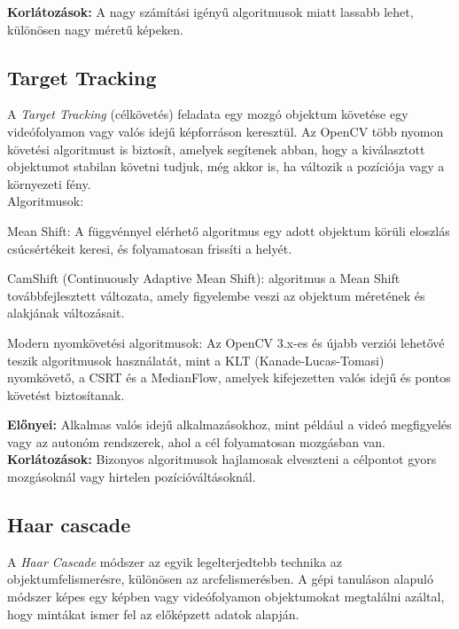 \textbf{Korlátozások:} A nagy számítási igényű algoritmusok miatt lassabb lehet, különösen nagy méretű képeken.

\subsection{Target Tracking } \label{sec:soft_target}

A \textsl{Target Tracking} \cite{targettracking} (célkövetés) feladata egy mozgó objektum követése egy videófolyamon vagy valós idejű képforráson keresztül. Az OpenCV több nyomon követési algoritmust is biztosít, amelyek segítenek abban, hogy a kiválasztott objektumot stabilan követni tudjuk, még akkor is, ha változik a pozíciója vagy a környezeti fény.\\

Algoritmusok:
\begin{list}{-}{}
	\item Mean Shift: A  függvénnyel elérhető algoritmus egy adott objektum körüli eloszlás csúcsértékeit keresi, és folyamatosan frissíti a helyét.
	\item CamShift (Continuously Adaptive Mean Shift):  algoritmus a Mean Shift továbbfejlesztett változata, amely figyelembe veszi az objektum méretének és alakjának változásait.
	\item Modern nyomkövetési algoritmusok: Az OpenCV 3.x-es és újabb verziói lehetővé teszik algoritmusok használatát, mint a KLT (Kanade-Lucas-Tomasi) nyomkövető, a CSRT és a MedianFlow, amelyek kifejezetten valós idejű és pontos követést biztosítanak.
\end{list}

\textbf{Előnyei:} Alkalmas valós idejű alkalmazásokhoz, mint például a videó megfigyelés vagy az autonóm rendszerek, ahol a cél folyamatosan mozgásban van.\\

\textbf{Korlátozások:} Bizonyos algoritmusok hajlamosak elveszteni a célpontot gyors mozgásoknál vagy hirtelen pozícióváltásoknál.

\pagebreak

\subsection{Haar cascade } \label{sec:soft_haar}

A \textsl{Haar Cascade} \cite{haarcascade} módszer az egyik legelterjedtebb technika az objektumfelismerésre, különösen az arcfelismerésben. A gépi tanuláson alapuló módszer képes egy képben vagy videófolyamon objektumokat megtalálni azáltal, hogy mintákat ismer fel az előképzett adatok alapján.\\

